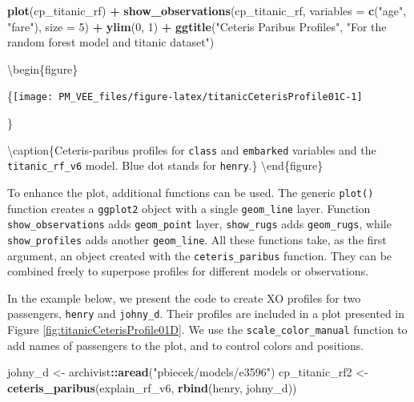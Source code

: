 \documentclass[12pt,]{krantz}
\newenvironment{Shaded}{\begin{snugshade}}{\end{snugshade}}
\newcommand{\DataTypeTok}[1]{\textcolor[rgb]{0.13,0.29,0.53}{#1}}
\newcommand{\DecValTok}[1]{\textcolor[rgb]{0.00,0.00,0.81}{#1}}
\newcommand{\KeywordTok}[1]{\textcolor[rgb]{0.13,0.29,0.53}{\textbf{#1}}}
\newcommand{\NormalTok}[1]{#1}
\newcommand{\OperatorTok}[1]{\textcolor[rgb]{0.81,0.36,0.00}{\textbf{#1}}}
\newcommand{\StringTok}[1]{\textcolor[rgb]{0.31,0.60,0.02}{#1}}
\begin{document}
\begin{Shaded}
\begin{Highlighting}[]
\KeywordTok{plot}\NormalTok{(cp_titanic_rf) }\OperatorTok{+}\StringTok{ }
\StringTok{  }\KeywordTok{show_observations}\NormalTok{(cp_titanic_rf, }\DataTypeTok{variables =} \KeywordTok{c}\NormalTok{(}\StringTok{"age"}\NormalTok{, }\StringTok{"fare"}\NormalTok{), }\DataTypeTok{size =} \DecValTok{5}\NormalTok{) }\OperatorTok{+}\StringTok{ }
\StringTok{  }\KeywordTok{ylim}\NormalTok{(}\DecValTok{0}\NormalTok{, }\DecValTok{1}\NormalTok{) }\OperatorTok{+}
\StringTok{  }\KeywordTok{ggtitle}\NormalTok{(}\StringTok{"Ceteris Paribus Profiles"}\NormalTok{, }\StringTok{"For the random forest model and titanic dataset"}\NormalTok{)}
\end{Highlighting}
\end{Shaded}

\textbackslash{}begin\{figure\}

\{\centering \texttt{[image: PM\_VEE\_files/figure-latex/titanicCeterisProfile01C-1]}

\}

\textbackslash{}caption\{Ceteris-paribus profiles for \texttt{class} and \texttt{embarked} variables and the \texttt{titanic\_rf\_v6} model. Blue dot stands for \texttt{henry}.\}\label{fig:titanicCeterisProfile01C}
\textbackslash{}end\{figure\}

To enhance the plot, additional functions can be used. The generic \texttt{plot()} function creates a \texttt{ggplot2} object with a single \texttt{geom\_line} layer. Function \texttt{show\_observations} adds \texttt{geom\_point} layer, \texttt{show\_rugs} adds \texttt{geom\_rugs}, while \texttt{show\_profiles} adds another \texttt{geom\_line}. All these functions take, as the first argument, an object created with the \texttt{ceteris\_paribus} function. They can be combined freely to superpose profiles for different models or observations.

In the example below, we present the code to create XO profiles for two passengers, \texttt{henry} and \texttt{johny\_d}. Their profiles are included in a plot presented in Figure \ref{fig:titanicCeterisProfile01D}. We use the \texttt{scale\_color\_manual} function to add names of passengers to the plot, and to control colors and positions.

\begin{Shaded}
\begin{Highlighting}[]
\NormalTok{johny_d <-}\StringTok{ }\NormalTok{archivist}\OperatorTok{::}\KeywordTok{aread}\NormalTok{(}\StringTok{"pbiecek/models/e3596"}\NormalTok{)}
\NormalTok{cp_titanic_rf2 <-}\StringTok{ }\KeywordTok{ceteris_paribus}\NormalTok{(explain_rf_v6, }\KeywordTok{rbind}\NormalTok{(henry, johny_d))}
\end{Highlighting}
\end{Shaded}
\end{document}
